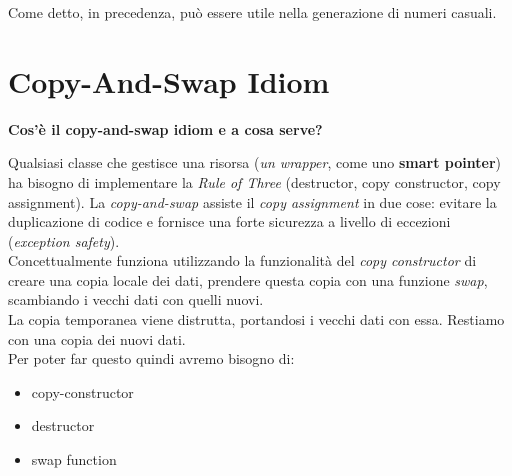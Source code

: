 \textsf{\small Come detto, in precedenza, può essere utile nella generazione di numeri casuali.} \\



\section{Copy-And-Swap Idiom}

\textsf{\small \textbf{Cos'è il \textbf{copy-and-swap idiom} e a cosa serve?}} \break

\textsf{\small Qualsiasi classe che gestisce una risorsa (\emph{un wrapper}, come uno \textbf{smart pointer}) ha bisogno di implementare la \emph{Rule of Three} (destructor, copy constructor, copy assignment). La \emph{copy-and-swap} assiste il \emph{copy assignment} in due cose: evitare la duplicazione di codice e fornisce una forte sicurezza a livello di eccezioni (\emph{exception safety}).} \\

\textsf{\small Concettualmente funziona utilizzando la funzionalità del \emph{copy constructor} di creare una copia locale dei dati, prendere questa copia con una funzione \emph{swap}, scambiando i vecchi dati con quelli nuovi.} \\

\textsf{\small La copia temporanea viene distrutta, portandosi i vecchi dati con essa. Restiamo con una copia dei nuovi dati.} \\

\textsf{\small Per poter far questo quindi avremo bisogno di: } \\

\begin{itemize}
	\item \textsf{\small copy-constructor}
	\item \textsf{\small destructor}
	\item \textsf{\small swap function}
\end{itemize}

